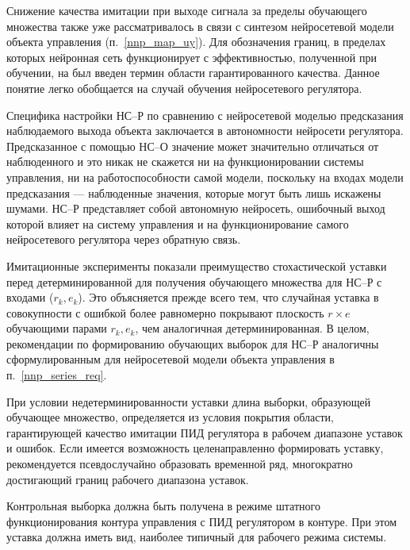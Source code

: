 Снижение качества имитации при выходе сигнала за пределы обучающего
множества также уже рассматривалось в связи с синтезом нейросетевой
модели объекта управления (п.~\ref{nnp_map_uy}).  Для обозначения
границ, в пределах которых нейронная сеть функционирует с
эффективностью, полученной при обучении, на
 был введен термин области
гарантированного качества. Данное понятие легко обобщается на случай
обучения нейросетевого регулятора.

Специфика настройки НС--Р по сравнению с нейросетевой моделью
предсказания наблюдаемого выхода объекта заключается в автономности
нейросети регулятора.  Предсказанное с помощью НС--О значение может
значительно отличаться от наблюденного и это никак не скажется ни на
функционировании системы управления, ни на работоспособности самой
модели, поскольку на входах модели предсказания --- наблюденные
значения, которые могут быть лишь искажены шумами.  НС--Р представляет
собой автономную нейросеть, ошибочный выход которой влияет на систему
управления и на функционирование самого нейросетевого регулятора через
обратную связь.

Имитационные эксперименты показали преимущество стохастической уставки
перед детерминированной для получения обучающего множества для НС--Р с
входами ($r_k,e_k$).  Это объясняется прежде всего тем, что случайная
уставка в совокупности с ошибкой более равномерно покрывают плоскость
$r\times e$ обучающими парами $r_k,e_k$, чем аналогичная
детерминированная.  В целом, рекомендации по формированию обучающих
выборок для НС--Р аналогичны сформулированным для нейросетевой модели
объекта управления в п.~\ref{nnp_series_req}.

При условии недетерминированности уставки длина выборки, образующей
обучающее множество, определяется из условия покрытия области,
гарантирующей качество имитации ПИД регулятора в рабочем диапазоне
уставок и ошибок.  Если имеется возможность целенаправленно
формировать уставку, рекомендуется псевдослучайно образовать временной
ряд, многократно достигающий границ рабочего диапазона уставок.

Контрольная выборка должна быть получена в режиме штатного
функционирования контура управления с ПИД регулятором в контуре.  При
этом уставка должна иметь вид, наиболее типичный для рабочего режима
системы.
